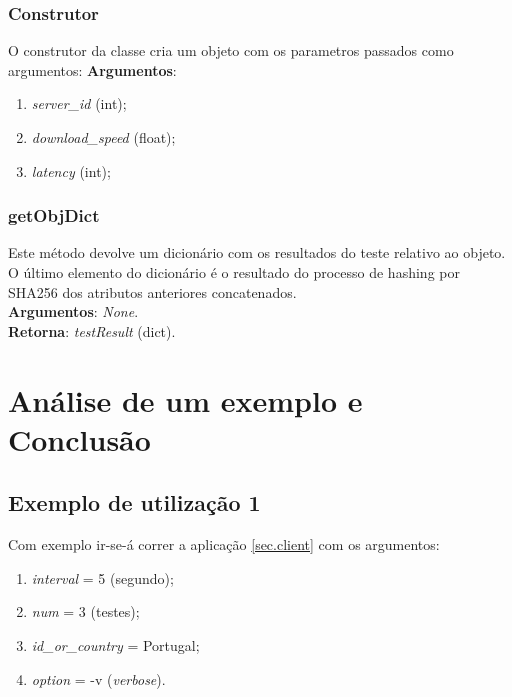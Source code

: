 \documentclass{report}
\begin{document}
\subsection{Construtor}
O construtor da classe cria um objeto com os parametros passados como argumentos:
\textbf{Argumentos}:
\begin{enumerate}
\item \textit{server\_id} (int);
\item \textit{download\_speed} (float);
\item \textit{latency} (int);
\end{enumerate}

\subsection{getObjDict}
Este método devolve um dicionário com os resultados do teste relativo ao objeto. O último elemento do dicionário é o resultado do processo de hashing por SHA256 dos atributos anteriores concatenados.\\
\textbf{Argumentos}: \textit{None}.\\
\textbf{Retorna}: \textit{testResult} (dict).
\chapter{Análise de um exemplo e Conclusão}
\label{chap:analiseconclusao}
\section{Exemplo de utilização 1}
\label{sec:example1}
Com exemplo ir-se-á correr a aplicação \autoref{sec.client} com os argumentos:
\begin{enumerate}
\item \textit{interval} = 5 (segundo);
\item \textit{num} = 3 (testes);
\item \textit{id\_or\_country} = Portugal;
\item \textit{option} = -v (\textit{verbose}).
\end{enumerate}
\end{document}
